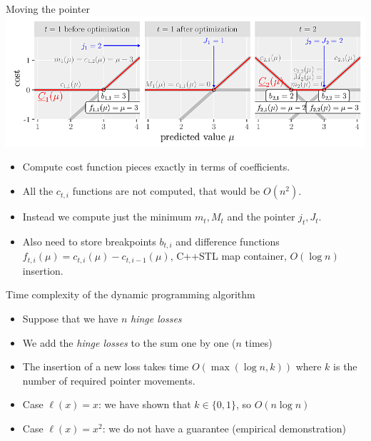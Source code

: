 \documentclass{beamer}
\begin{document}
\begin{frame}{Moving the pointer}
  \includegraphics[width=\textwidth]{figure-algorithm-steps}

  \begin{itemize}
  \item Compute cost function pieces exactly in terms of coefficients.
  \item All the $c_{t,i}$ functions are not computed, that would be
    $O(n^2)$.
  \item Instead we compute just the minimum $m_t,M_t$ and
    the pointer $j_t,J_t$.
  \item Also need to store breakpoints $b_{t,i}$ and difference
    functions $f_{t,i}(\mu)=c_{t,i}(\mu)-c_{t,i-1}(\mu)$, C++STL map
    container, $O(\log n)$ insertion.
  \end{itemize}
\end{frame}

\begin{frame}{Time complexity of the dynamic programming algorithm}
	\begin{itemize}
		\item<+-> Suppose that we have $n$ \emph{hinge losses} \vspace{5mm}
		\item<+-> We add the \emph{hinge losses} to the sum one by one  ($n$ times) \vspace{5mm}
		\item<+-> The insertion of a new loss takes time $O(\max(\log n, k))$ where $k$ is the number of required pointer movements. \vspace{5mm}
		\item<+-> Case $\ell(x) = x$: we have shown that $k \in \{0, 1\}$, so $O(n \log n)$ \vspace{5mm}
		\item<+-> Case $\ell(x) = x^2$: we do not have a guarantee (empirical demonstration)
	\end{itemize}
\end{frame}
\end{document}
